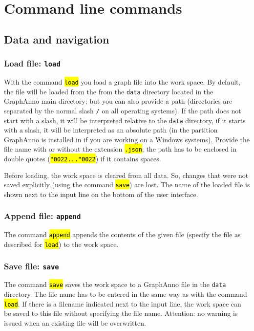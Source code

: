 \documentclass[12pt]{scrartcl}
\newcommand{\quo}{\char"0022}
\newcommand{\code}[1]{\hl{\texttt{#1}}}
\begin{document}
\section{Command line commands}

\subsection{Data and navigation}

\subsubsection{Load file: \texttt{load}}

With the command \code{load} you load a graph file into the work space.
By default, the file will be loaded from the from the \texttt{data} directory located in the GraphAnno main directory; but you can also provide a path (directories are separated by the normal slash \texttt{/} on all operating systems).
If the path does not start with a slash, it will be interpreted relative to the \texttt{data} directory, if it starts with a slash, it will be interpreted as an absolute path (in the partition GraphAnno is installed in if you are working on a Windows systems).
Provide the file name with or without the extension \code{.json}; the path has to be enclosed in double quotes (\code{\quo...\quo}) if it contains spaces.

Before loading, the work space is cleared from all data.
So, changes that were not saved explicitly (using the command \code{save}) are lost.
The name of the loaded file is shown next to the input line on the bottom of the user interface.


\subsubsection{Append file: \texttt{append}}

The command \code{append} appends the contents of the given file (specify the file as described for \code{load}) to the work space.


\subsubsection{Save file: \texttt{save}}

The command \code{save} saves the work space to a GraphAnno file in the \texttt{data} directory.
The file name has to be entered in the same way as with the command \code{load}.
If there is a filename indicated next to the input line, the work space can be saved to this file without specifying the file name.
Attention: no warning is issued when an existing file will be overwritten.
\end{document}
